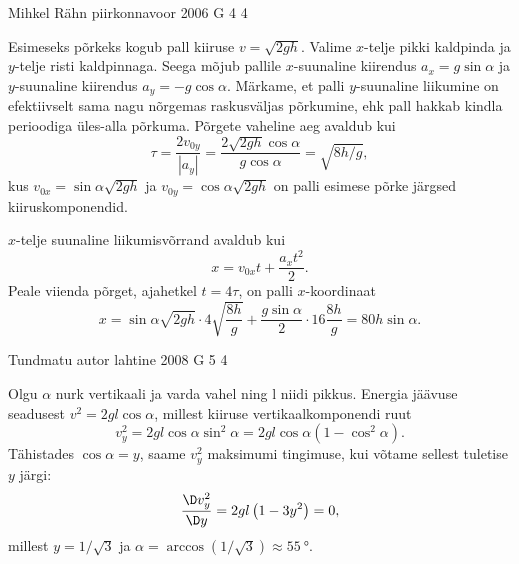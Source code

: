 \documentclass[11pt, twoside]{article}
\begin{document}
{%
{Mihkel Rähn} %
{piirkonnavoor} %
{2006} %
{G 4} %
{4} %
{

\ifSolution
Esimeseks põrkeks kogub pall kiiruse $v = \sqrt{2gh}$. Valime $x$-telje pikki kaldpinda ja $y$-telje risti kaldpinnaga. Seega mõjub pallile $x$-suunaline kiirendus $a_x = g\sin\alpha$ ja $y$-suunaline kiirendus $a_y = -g\cos\alpha$. Märkame, et palli $y$-suunaline liikumine on efektiivselt sama nagu nõrgemas raskusväljas põrkumine, ehk pall hakkab kindla perioodiga üles-alla põrkuma. Põrgete vaheline aeg avaldub kui 
\[
\tau = \frac{2v_{0y}}{|a_y|} = \frac{2 \sqrt{2 g h} \cos \alpha}{g \cos \alpha} = \sqrt{8h/g},
\]
kus $v_{0x} = \sin\alpha\sqrt{2gh}$ ja $v_{0y}=\cos\alpha\sqrt{2gh}$ on palli esimese põrke järgsed kiiruskomponendid.

$x$-telje suunaline liikumisvõrrand avaldub kui
\[
x = v_{0x}t + \frac{a_xt^2}{2}.
\]
Peale viienda põrget, ajahetkel $t = 4\tau$, on palli $x$-koordinaat
\[
x = \sin\alpha\sqrt{2gh}\cdot 4\sqrt{\frac{8h}{g}} + \frac{g\sin\alpha}{2}\cdot 16\frac{8h}{g} = 80h\sin\alpha.
\]
\fi
}

{Tundmatu autor} %
{lahtine} %
{2008} %
{G 5} %
{4} %
{

\ifSolution
Olgu $\alpha$ nurk vertikaali ja varda vahel ning l niidi pikkus. Energia jäävuse seadusest
$v^2 = 2gl \cos \alpha$, millest kiiruse vertikaalkomponendi ruut
\[
v_{y}^{2}=2 g l \cos \alpha \sin ^{2} \alpha=2 g l \cos \alpha\left(1-\cos ^{2} \alpha\right).
\]
Tähistades $\cos \alpha = y$, saame $v_y^2$ maksimumi tingimuse, kui võtame sellest tuletise $y$ järgi:
\[
\frac{\D v_{y}^{2}}{\D y}=2 g l\left( 1-3 y^{2}\right)=0,
\]
millest $y = 1/ \sqrt 3$ ja $\alpha = \arccos \left( 1/ \sqrt 3\right) \approx \SI{55}{\degree}$.

\vspace{0.5\baselineskip}

}}
\end{document}
